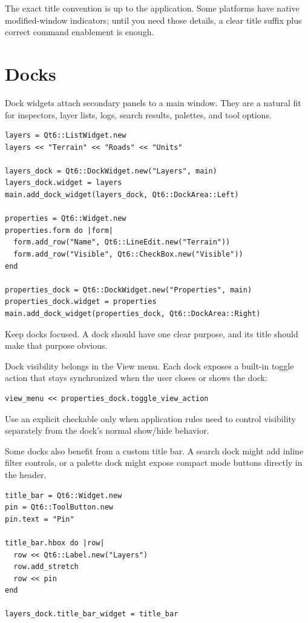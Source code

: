 The exact title convention is up to the application. Some platforms have native modified-window indicators; until you need those details, a clear title suffix plus correct command enablement is enough.

\section{Docks}

Dock widgets attach secondary panels to a main window. They are a natural fit for inspectors, layer lists, logs, search results, palettes, and tool options.

\begin{lstlisting}[style=crystal]
layers = Qt6::ListWidget.new
layers << "Terrain" << "Roads" << "Units"

layers_dock = Qt6::DockWidget.new("Layers", main)
layers_dock.widget = layers
main.add_dock_widget(layers_dock, Qt6::DockArea::Left)

properties = Qt6::Widget.new
properties.form do |form|
  form.add_row("Name", Qt6::LineEdit.new("Terrain"))
  form.add_row("Visible", Qt6::CheckBox.new("Visible"))
end

properties_dock = Qt6::DockWidget.new("Properties", main)
properties_dock.widget = properties
main.add_dock_widget(properties_dock, Qt6::DockArea::Right)
\end{lstlisting}

Keep docks focused. A dock should have one clear purpose, and its title should make that purpose obvious.

Dock visibility belongs in the View menu. Each dock exposes a built-in toggle action that stays synchronized when the user closes or shows the dock:

\begin{lstlisting}[style=crystal]
view_menu << properties_dock.toggle_view_action
\end{lstlisting}

Use an explicit checkable  only when application rules need to control visibility separately from the dock's normal show/hide behavior.

Some docks also benefit from a custom title bar. A search dock might add inline filter controls, or a palette dock might expose compact mode buttons directly in the header.

\begin{lstlisting}[style=crystal]
title_bar = Qt6::Widget.new
pin = Qt6::ToolButton.new
pin.text = "Pin"

title_bar.hbox do |row|
  row << Qt6::Label.new("Layers")
  row.add_stretch
  row << pin
end

layers_dock.title_bar_widget = title_bar
\end{lstlisting}

